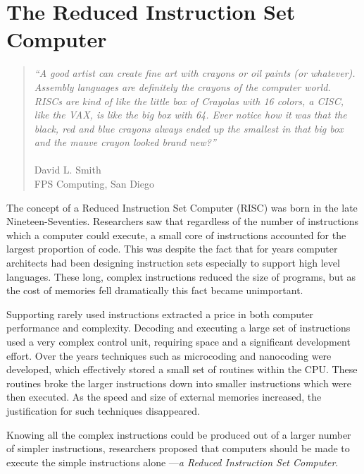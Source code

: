 
\section{The Reduced Instruction Set Computer}

\begin{quotation}
{\em
	``A good artist can create fine art with crayons or oil paints (or
whatever).  Assembly languages are definitely the crayons of the computer
world.  RISCs are kind of like the little box of Crayolas with 16 colors,
a CISC, like the VAX, is like the big box with 64.  Ever notice how it was
that the black, red and blue crayons always ended up the smallest in that
big box and the mauve crayon looked brand new?''\\\\
}
David L. Smith\\
FPS Computing, San Diego\\
\end{quotation}

The concept of a Reduced Instruction Set Computer (RISC) was born in the late Nineteen-Seventies. 
Researchers saw that regardless of the number of instructions which a computer could execute,  a  small core of instructions accounted for the largest proportion of code.
This was despite the fact that for years computer architects had been designing
instruction sets especially to support high level languages.
These long, complex instructions  reduced the size of programs, but as the cost of   memories   fell dramatically this fact became unimportant.
 
Supporting  rarely used instructions extracted a price in both computer performance and complexity. 
Decoding and executing a large set of instructions used a very complex control unit, requiring   space and a significant  development effort. 
  Over the years techniques such as microcoding and nanocoding were developed, which effectively stored a small set of routines  within the CPU. 
  These routines broke the larger instructions down into smaller instructions which were then executed.
  As the speed and size of external memories increased, the justification for such techniques disappeared.
  
Knowing all the complex instructions could be produced out of a  larger number of simpler instructions, researchers proposed that computers should be made to execute the simple instructions alone ---{\em a Reduced Instruction Set Computer}. 

